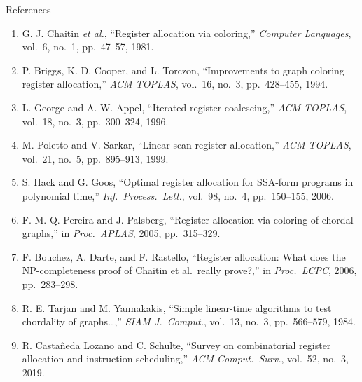 \documentclass[aspectratio=169,11pt]{beamer}
\begin{document}
\begin{frame}{References}
\vspace{1mm}
{\scriptsize
\begin{enumerate}\setlength{\itemsep}{1.1mm}
\item G. J. Chaitin \emph{et al.}, ``Register allocation via coloring,''
      \emph{Computer Languages}, vol.\ 6, no.\ 1, pp.\ 47--57, 1981.
\item P. Briggs, K. D. Cooper, and L. Torczon, ``Improvements to graph coloring
      register allocation,'' \emph{ACM TOPLAS}, vol.\ 16, no.\ 3,
      pp.\ 428--455, 1994.
\item L. George and A. W. Appel, ``Iterated register coalescing,''
      \emph{ACM TOPLAS}, vol.\ 18, no.\ 3, pp.\ 300--324, 1996.
\item M. Poletto and V. Sarkar, ``Linear scan register allocation,''
      \emph{ACM TOPLAS}, vol.\ 21, no.\ 5, pp.\ 895--913, 1999.
\item S. Hack and G. Goos, ``Optimal register allocation for SSA-form programs
      in polynomial time,'' \emph{Inf.\ Process.\ Lett.}, vol.\ 98, no.\ 4,
      pp.\ 150--155, 2006.
\item F. M. Q. Pereira and J. Palsberg, ``Register allocation via coloring of
      chordal graphs,'' in \emph{Proc.\ APLAS}, 2005, pp.\ 315--329.
\item F. Bouchez, A. Darte, and F. Rastello, ``Register allocation: What does
      the NP-completeness proof of Chaitin et al.\ really prove?,'' in
      \emph{Proc.\ LCPC}, 2006, pp.\ 283--298.
\item R. E. Tarjan and M. Yannakakis, ``Simple linear-time algorithms to test
      chordality of graphs\dots,'' \emph{SIAM J.\ Comput.}, vol.\ 13, no.\ 3,
      pp.\ 566--579, 1984.
\item R. Casta\~{n}eda Lozano and C. Schulte, ``Survey on combinatorial register
      allocation and instruction scheduling,'' \emph{ACM Comput.\ Surv.},
      vol.\ 52, no.\ 3, 2019.
\end{enumerate}}
\end{frame}
\end{document}
